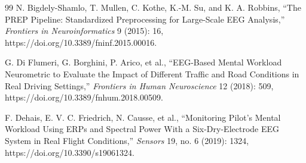 \documentclass[10pt]{iopart}
\begin{document}
\begin{thebibliography}{99}
N. Bigdely-Shamlo, T. Mullen, C. Kothe, K.-M. Su, and K. A. Robbins,
``The PREP Pipeline: Standardized Preprocessing for Large-Scale EEG
Analysis,''
\textit{Frontiers in Neuroinformatics} 9 (2015): 16,
https://doi.org/10.3389/fninf.2015.00016.

G. Di Flumeri, G. Borghini, P. Arico, et al.,
``EEG-Based Mental Workload Neurometric to Evaluate the Impact of
Different Traffic and Road Conditions in Real Driving Settings,''
\textit{Frontiers in Human Neuroscience} 12 (2018): 509,
https://doi.org/10.3389/fnhum.2018.00509.

F. Dehais, E. V. C. Friedrich, N. Causse, et al.,
``Monitoring Pilot's Mental Workload Using ERPs and Spectral Power
With a Six-Dry-Electrode EEG System in Real Flight Conditions,''
\textit{Sensors} 19, no. 6 (2019): 1324,
https://doi.org/10.3390/s19061324.

\end{thebibliography}
\end{document}
